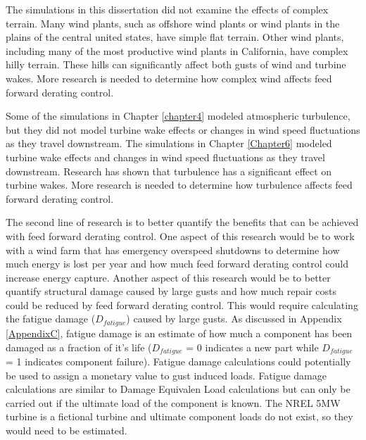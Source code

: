 The simulations in this dissertation did not examine the effects of complex terrain. Many wind plants, such as offshore wind plants or wind plants in the plains of the central united states, have simple flat terrain. Other wind plants, including many of the most productive wind plants in California, have complex hilly terrain. These hills can significantly affect both gusts of wind and turbine wakes. More research is needed to determine how complex wind affects feed forward derating control. 

Some of the simulations in Chapter \ref{chapter4} modeled atmospheric turbulence, but they did not model turbine wake effects or changes in wind speed fluctuations as they travel downstream. The simulations in Chapter \ref{Chapter6} modeled  turbine wake effects and changes in wind speed fluctuations as they travel downstream. Research has shown that turbulence has a significant effect on turbine wakes.\cite{troldborg2015, troldborg2010,troldborg2010b,madsen2010} More research is needed to determine how turbulence affects feed forward derating control.

The second line of research is to better quantify the benefits that can be achieved with feed forward derating control. One aspect of this research would be to work with a wind farm that has emergency overspeed shutdowns to determine how much energy is lost per year and how much feed forward derating control could increase energy capture. Another aspect of this research would be to better quantify structural damage caused by large gusts and how much repair costs could be reduced by feed forward derating control. This would require calculating the fatigue damage ($D_{fatigue}$) caused by large gusts. As discussed in Appendix \ref{AppendixC}, fatigue damage is an estimate of how much a component has been damaged as a fraction of it's life ($D_{fatigue}$ = 0 indicates a new part while $D_{fatigue}$ = 1 indicates component failure). Fatigue damage calculations could potentially be used to assign a monetary value to gust induced loads. Fatigue damage calculations are similar to Damage Equivalen Load calculations but can only be carried out if the ultimate load of the component is known. The NREL 5MW turbine is a fictional turbine and ultimate component loads do not exist, so they would need to be estimated. 